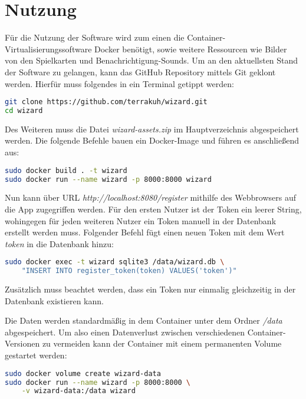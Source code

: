 \chapter{Nutzung}
Für die Nutzung der Software wird zum einen die Container-Virtualisierungssoftware Docker benötigt, sowie weitere Ressourcen wie Bilder von den Spielkarten und Benachrichtigung-Sounds. Um an den aktuellsten Stand der Software zu gelangen, kann das GitHub Repository mittels Git geklont werden. Hierfür muss folgendes in ein Terminal getippt werden:

\begin{lstlisting}[language=bash]
git clone https://github.com/terrakuh/wizard.git
cd wizard
\end{lstlisting}

Des Weiteren muss die Datei \textit{wizard-assets.zip} im Hauptverzeichnis abgespeichert werden. Die folgende Befehle bauen ein Docker-Image und führen es anschließend aus:

\begin{lstlisting}[language=bash]
sudo docker build . -t wizard
sudo docker run --name wizard -p 8000:8000 wizard
\end{lstlisting}

Nun kann über URL \textit{http://localhost:8080/register} mithilfe des Webbrowsers auf die App zugegriffen werden. Für den ersten Nutzer ist der Token ein leerer String, wohingegen für jeden weiteren Nutzer ein Token manuell in der Datenbank erstellt werden muss. Folgender Befehl fügt einen neuen Token mit dem Wert \textit{token} in die Datenbank hinzu:

\begin{lstlisting}[language=bash]
sudo docker exec -t wizard sqlite3 /data/wizard.db \
	"INSERT INTO register_token(token) VALUES('token')"
\end{lstlisting}

Zusätzlich muss beachtet werden, dass ein Token nur einmalig gleichzeitig in der Datenbank existieren kann.

Die Daten werden standardmäßig in dem Container unter dem Ordner \textit{/data} abgespeichert. Um also einen Datenverlust zwischen verschiedenen Container-Versionen zu vermeiden kann der Container mit einem permanenten Volume gestartet werden:

\begin{lstlisting}[language=bash]
sudo docker volume create wizard-data
sudo docker run --name wizard -p 8000:8000 \
	-v wizard-data:/data wizard
\end{lstlisting}